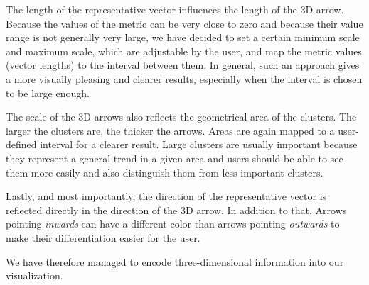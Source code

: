 The length of the representative vector influences the length of the 3D arrow. Because the values of the metric can be very close to zero and because their value range is not generally very large, we have decided to set a certain minimum scale and maximum scale, which are adjustable by the user, and map the metric values (vector lengths) to the interval between them. In general, such an approach gives a more visually pleasing and clearer results, especially when the interval is chosen to be large enough.

The scale of the 3D arrows also reflects the geometrical area of the clusters. The larger the clusters are, the thicker the arrows. Areas are again mapped to a user-defined interval for a clearer result. Large clusters are usually important because they represent a general trend in a given area and users should be able to see them more easily and also distinguish them from less important clusters.

Lastly, and most importantly, the direction of the representative vector is reflected directly in the direction of the 3D arrow. In addition to that, Arrows pointing {\it inwards} can have a different color than arrows pointing {\it outwards} to make their differentiation easier for the user.

We have therefore managed to encode three-dimensional information into our visualization.

